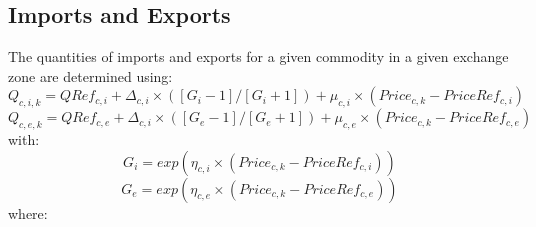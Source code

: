 \subsection{Imports and Exports}\label{sec:aa-import-export}
The quantities of imports and exports for a given commodity in a given exchange zone are determined using:
\begin{equation}\label{eq:6.21}
Q_{c,i,k} = QRef_{c,i}  + \Delta_{c,i} \times ([G_i-1]/[G_i+1]) + \mu_{c,i} \times (Price_{c,k} - PriceRef_{c,i})
\end{equation}
\begin{equation}\label{eq:6.22}
Q_{c,e,k}  = QRef_{c,e} + \Delta_{c,i} \times ([G_e-1]/[G_e+1]) + \mu_{c,e} \times (Price_{c,k} - PriceRef_{c,e})
\end{equation}
\noindent with:
\begin{equation}\label{eq:6.23}
G_i = exp(\eta_{c,i} \times (Price_{c,k} - PriceRef_{c,i}))
\end{equation}
\begin{equation}\label{eq:6.24}
G_e = exp(\eta_{c,e} \times (Price_{c,k} - PriceRef_{c,e}))
\end{equation}
\noindent where:
